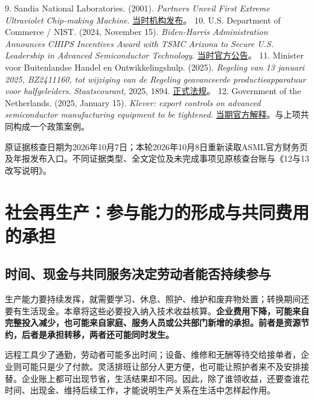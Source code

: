 \documentclass[UTF8,fontset=windows,12pt,a4paper,oneside,openany]{ctexbook}
\begin{document}
9. Sandia National Laboratories. (2001). \emph{Partners Unveil First Extreme Ultraviolet Chip-making Machine}. \href{https://newsreleases.sandia.gov/partners-unveil-first-extreme-ultraviolet-chip-making-machine/}{当时机构发布}。
10. U.S. Department of Commerce / NIST. (2024, November 15). \emph{Biden-Harris Administration Announces CHIPS Incentives Award with TSMC Arizona to Secure U.S. Leadership in Advanced Semiconductor Technology}. \href{https://www.nist.gov/news-events/news/2024/11/biden-harris-administration-announces-chips-incentives-award-tsmc-arizona}{当时官方公告}。
11. Minister voor Buitenlandse Handel en Ontwikkelingshulp. (2025). \emph{Regeling van 13 januari 2025, BZ2411160, tot wijziging van de Regeling geavanceerde productieapparatuur voor halfgeleiders}. \emph{Staatscourant}, 2025, 1894. \href{https://zoek.officielebekendmakingen.nl/stcrt-2025-1894.pdf}{正式法规}。
12. Government of the Netherlands. (2025, January 15). \emph{Klever: export controls on advanced semiconductor manufacturing equipment to be tightened}. \href{https://www.government.nl/latest/news/2025/01/15/klever-export-controls-on-advanced-semiconductor-manufacturing-equipment-to-be-tightened}{当期官方解释}。与上项共同构成一个政策案例。

原证据核查日期为2026年10月7日；本轮2026年10月8日重新读取ASML官方财务页及年报发布入口。不同证据类型、全文定位及未完成事项见原核查台账与《12与13改写说明》。



\chapter{社会再生产：参与能力的形成与共同费用的承担}\label{ch:13}

\section{时间、现金与共同服务决定劳动者能否持续参与}

生产能力要持续发挥，就需要学习、休息、照护、维护和废弃物处置；转换期间还要有生活现金。本章将这些必要投入纳入技术收益核算。\textbf{企业费用下降，可能来自完整投入减少，也可能来自家庭、服务人员或公共部门新增的承担。前者是资源节约，后者是承担转移，两者还可能同时发生。}

远程工具少了通勤，劳动者可能多出时间；设备、维修和无酬等待交给接单者，企业则可能只是少了付款。灵活排班让部分人更方便，也可能让照护者来不及安排接替。企业账上都可出现节省，生活结果却不同。因此，除了谁领收益，还要查谁花时间、出现金、维持后续工作，才能说明生产关系在生活中怎样起作用。
\end{document}

